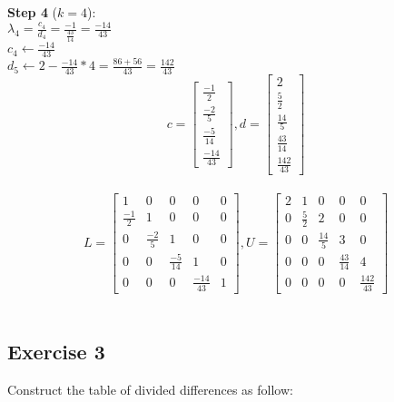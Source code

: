 \documentclass[12pt]{article}
\begin{document}
\textbf{Step 4} ($k=4$): \\
$ \lambda_4 = \frac{c_4}{d_4} = \frac{-1}{\frac{43}{14}} = \frac{-14}{43} $ \\
$ c_4 \gets \frac{-14}{43} $ \\
$ d_5 \gets 2 - \frac{-14}{43} * 4 = \frac{86 + 56}{43} = \frac{142}{43} $ \\

$$c = \begin{bmatrix}
  \frac{-1}{2} \\
  \frac{-2}{5} \\
  \frac{-5}{14} \\
  \frac{-14}{43}
\end{bmatrix}, d = \begin{bmatrix}
  2 \\
  \frac{5}{2} \\
  \frac{14}{5} \\
  \frac{43}{14} \\
  \frac{142}{43}
\end{bmatrix}$$ \\

$$L = \begin{bmatrix}
  1 & 0 & 0 & 0 & 0 \\
  \frac{-1}{2} & 1 & 0 & 0 & 0 \\
  0 & \frac{-2}{5} & 1 & 0 & 0 \\
  0 & 0 & \frac{-5}{14} & 1 & 0 \\
  0 & 0 & 0 & \frac{-14}{43} & 1
\end{bmatrix}, U = \begin{bmatrix}
  2 & 1 & 0 & 0 & 0 \\
  0 & \frac{5}{2} & 2 & 0 & 0 \\
  0 & 0 & \frac{14}{5} & 3 & 0 \\
  0 & 0 & 0 & \frac{43}{14} & 4 \\
  0 & 0 & 0 & 0 & \frac{142}{43}
\end{bmatrix}$$ \\

\subsection{Exercise 3}

Construct the table of divided differences as follow: \\
\end{document}
